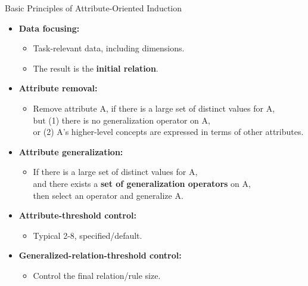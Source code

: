 \begin{frame}{Basic Principles of Attribute-Oriented Induction}
  \begin{itemize}
  \item \textbf{Data focusing:}
    \begin{itemize}
    \item Task-relevant data, including dimensions.
    \item The result is the \textbf{\color{airforceblue}initial relation}.
    \end{itemize}
  \item \textbf{\color{airforceblue}Attribute removal:}
    \begin{itemize}
    \item Remove attribute A, if there is a large set of distinct values for A,\\
      but (1) there is no generalization operator on A,\\
      or (2) A's higher-level concepts are expressed in terms of other attributes.
    \end{itemize}
  \item \textbf{\color{airforceblue}Attribute generalization:}
    \begin{itemize}
    \item If there is a large set of distinct values for A,\\
      and there exists a \textbf{\color{airforceblue}set of generalization operators} on A,\\
      then select an operator and generalize A.
    \end{itemize}
  \item \textbf{Attribute-threshold control:}
    \begin{itemize}
    \item Typical 2-8, specified/default.
    \end{itemize}
  \item \textbf{Generalized-relation-threshold control:}
    \begin{itemize}
    \item Control the final relation/rule size.
    \end{itemize}
  \end{itemize}
\end{frame}

